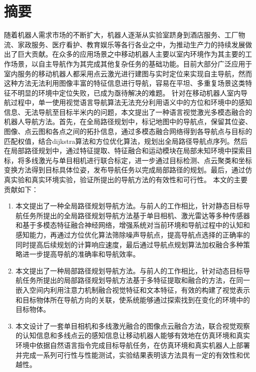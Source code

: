 \chapter{摘\texorpdfstring{\quad}{}要}
    随着机器人需求市场的不断扩大，机器人逐渐从实验室跻身到酒店服务、工厂物流、家政服务、医疗看护、教育娱乐等各行各业之中，为推动生产力的持续发展做出了巨大贡献。在众多的应用场景之中移动机器人主要以室内环境作为其主要的工作场景，以自主导航作为其完成其他复杂任务的基础功能。目前大部分广泛应用于室内服务的移动机器人都采用点云激光进行建图与实时定位来实现自主导航，然而这种方法无法利用图像丰富的特征信息进行导航，容易在平坦、多重复场景这类特征不明显的环境中定位失败，已成为亟待解决的难题。
    针对在移动机器人室内导航过程中，单一使用视觉语言导航算法无法充分利用语义中的方位和环境中的感知信息、无法导航至目标半米内的问题，本文提出了一种语言视觉激光多模态融合的机器人导航方法。首先，在全局路径规划中，标记地图中的导航点，保留其位姿、图像、点云图和各点之间的拓扑信息，通过多模态融合网络得到各导航点与目标的匹配权值，结合dijkstra算法和方位优化算法，规划出全局路径导航点序列。然后在局部路径规划中，通过特征提取、特征融合和运动模块在局部未知环境中探索目标，将多线激光与单目相机进行联合标定，进一步通过目标检测、点云聚类和坐标变换方法得到目标具体位姿，发布导航任务以完成局部路径的规划。最后，通过仿真实验和真实环境实验，验证所提出的导航方法的有效性和可行性。
    本文的主要贡献如下：
\begin{enumerate}[topsep = 0 pt, itemsep= 0 pt, parsep=0pt, partopsep=0pt, leftmargin=44pt, itemindent=0pt, labelsep=6pt, label=(\arabic*)]
    \item 	本文提出了一种全局路径规划导航方法。与前人的工作相比，针对静态目标导航任务所提出的全局路径规划导航方法基于单目相机、激光雷达等多种传感器和基于多模态特征融合神经网络，增强系统对当前环境和导航过程中的认知和感知能力，再通过方位优化算法筛除噪声导航点，提高导航点选择的正确率的同时提高后续规划的计算响应速度，最后通过导航点规划算法加权融合多种策略进一步提高导航的准确率和导航效率。
    \item	本文提出了一种局部路径规划导航方法。与前人的工作相比，针对动态目标导航任务所提出的局部路径规划导航方法基于多特征提取和融合的方法，在同一嵌入空间内利用注意力机制融合视觉特征和文本特征，有效的构建了视觉表示和目标物体所在导航方向的关联，使系统能够通过探索找到在变化的环境中的目标物体。
    \item	本文设计了一套单目相机和多线激光融合的图像点云融合方法，联合视觉观察的认知信息和多线点云的感知信息让移动机器人能够有效地在仿真环境和真实环境中依据自然语言指令完成目标导航任务，在仿真环境和真实机器人上部署并完成一系列可行性与性能测试，实验结果表明该方法具有一定的有效性和优越性。
\end{enumerate}

